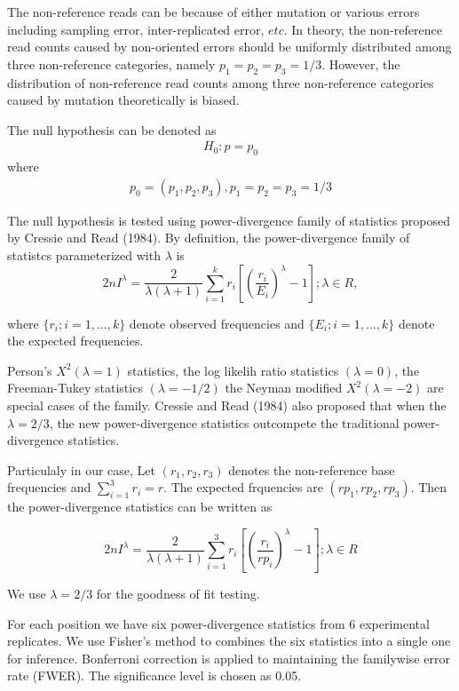 \documentclass[11pt,reqno]{amsart}
\begin{document}
The non-reference reads can be because of either mutation or various errors including sampling error, inter-replicated error, $etc$. In theory, the non-reference read counts caused by non-oriented errors should be uniformly distributed among three non-reference categories, namely $p_1=p_2=p_3=1/3$. However, the distribution of non-reference read counts among three non-reference categories caused by mutation theoretically is biased. 

The null hypothesis can be denoted as
\begin{align}
 H_0: p=p_0
\end{align}
where
\begin{align} 
 p_0=(p_1,p_2,p_3), p_1=p_2=p_3=1/3
\end{align}

The null hypothesis is tested using power-divergence family of statistics proposed by Cressie and Read (1984). By definition, the power-divergence family of statistcs parameterized with $\lambda$ is 
\begin{equation}
 2nI^\lambda = \frac{2}{\lambda(\lambda+1)}\sum_{i=1}^k r_i \left[\left(\frac{r_i}{E_i}\right)^\lambda-1\right];\lambda \in R,
\end{equation}

where $\{r_i; i=1,...,k\}$ denote observed frequencies and $\{E_i; i=1,...,k\}$ denote the expected frequencies.

Person's $X^2 (\lambda = 1)$ statistics, the log likelih ratio statistics $(\lambda = 0)$, the Freeman-Tukey statistics $(\lambda = -1/2)$ the Neyman modified $X^2 (\lambda = -2)$ are special cases of the family. Cressie and Read (1984) also proposed that when the $\lambda =2/3$, the new power-divergence statistics outcompete the traditional power-divergence statistics. 

Particulaly in our case, Let $(r_1,r_2,r_3)$ denotes the non-reference base frequencies and $\sum_{i=1}^3 r_i = r$. The expected frquencies are $(rp_1, rp_2, rp_3)$. Then the power-divergence statistics can be written as

\begin{equation}
 2nI^\lambda = \frac{2}{\lambda(\lambda+1)}\sum_{i=1}^3 r_i \left[\left(\frac{r_i}{rp_i}\right)^\lambda-1\right];\lambda \in R
\end{equation}

We use $\lambda =2/3$ for the goodness of fit testing.

For each position we have six power-divergence statistics from 6 experimental replicates. We use Fisher's method to combines the six statistics into a single one for inference. Bonferroni correction is applied to maintaining the familywise error rate (FWER). The significance level is chosen as 0.05.
\end{document}
